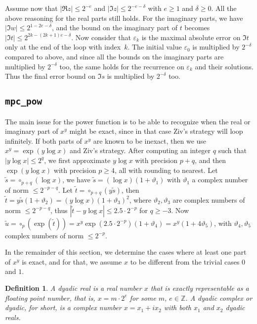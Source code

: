 \documentclass [11pt]{article}
\newcommand {\round}{\operatorname {\circ}}
\newcommand {\Z}{\mathbb Z}
\renewcommand {\theta}{\vartheta}
\renewcommand {\leq}{\leqslant}
\renewcommand {\geq}{\geqslant}
\newtheorem{definition}[theorem]{Definition}
\begin{document}
Assume now that $|\Re z| \leq 2^{-e}$ and $|\Im z| \leq 2^{-e-\delta}$ with
$e \geq 1$ and $\delta \geq 0$. All the above reasoning for the real parts still
holds. For the imaginary parts, we have
$|\Im w| \leq 2^{1-2e-\delta}$, and the bound on the imaginary part of $t$
becomes $|\Im t| \leq 2^{2k-(2k+1)e-\delta}$.
Now consider that $\varepsilon_k$ is the maximal absolute error on
$\Im t$ only at the end of the loop with index~$k$.
The initial value $\varepsilon_0$
is multiplied by $2^{-\delta}$ compared to above,
and since all the bounds on the imaginary
parts are multiplied by $2^{-\delta}$ too, the same holds for the recurrence
on $\varepsilon_k$ and their solutions. Thus the final error bound on
$\Im s$ is multiplied by $2^{-\delta}$ too.


\subsection {\texttt {mpc\_pow}}

The main issue for the power function is to be able to recognize when the
real or imaginary part of $x^y$ might be exact, since in that case
Ziv's strategy will loop infinitely.
If both parts of $x^y$ are known to be inexact, then we use
$x^y = \exp(y \log x)$ and Ziv's strategy.
After computing an integer $q$ such that $|y \log x| \leq 2^q$, we first
approximate $y \log x$ with precision $p + q$, and then
$\exp(y \log x)$ with precision $p \geq 4$, all with rounding
to nearest.
Let $\tilde{s} = \round_{p+q}(\log x)$,
we have $\tilde{s} = (\log x) (1 + \theta_1)$
with $\theta_1$ a complex number of norm $\leq 2^{-p-q}$.
Let $\tilde{t} = \round_{p+q}(y \tilde{s})$, then
$\tilde{t} = y \tilde{s} (1 + \theta_2) = (y \log x) (1 + \theta_3)^2$,
where $\theta_2, \theta_3$ are complex numbers of norm $\leq 2^{-p-q}$,
thus $|\tilde{t} - y \log x| \leq 2.5 \cdot 2^{-p}$ for $q \geq -3$.
Now $\tilde{u} = \round_p(\exp(\tilde{t})) =
x^y \exp(2.5 \cdot 2^{-p}) (1 + \theta_4) = x^y (1 + 4 \theta_5)$,
with $\theta_4, \theta_5$ complex numbers of norm $\leq 2^{-p}$.

In the remainder of this section, we determine the cases where at
least one part of $x^y$ is exact, and for that, we assume $x$ to be
different from the trivial cases $0$ and $1$.

\begin {definition}
A {\em dyadic real} is a real number $x$ that is exactly representable
as a floating point number, that is, $x = m \cdot 2^e$ for some $m$, $e \in \Z$.
A {\em dyadic complex} or {\em dyadic}, for short, is a complex number
$x = x_1 + i x_2$ with both $x_1$ and $x_2$ dyadic reals.
\end {definition}
\end{document}
